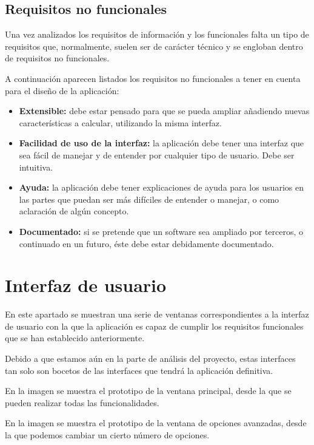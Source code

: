 \newpage
\subsection{Requisitos no funcionales}
Una vez analizados los requisitos de información y los funcionales falta un tipo de requisitos que, normalmente, suelen ser de carácter técnico y se engloban dentro de requisitos no funcionales.

A continuación aparecen listados los requisitos no funcionales a tener en cuenta para el diseño de la aplicación:

\begin{itemize}
 \item \textbf{Extensible:} debe estar pensado para que se pueda ampliar añadiendo nuevas características a calcular, utilizando la misma interfaz.
 \item \textbf{Facilidad de uso de la interfaz:} la aplicación debe tener una interfaz que sea fácil de manejar y de entender por cualquier tipo de usuario. Debe ser intuitiva.
 \item \textbf{Ayuda:} la aplicación debe tener explicaciones de ayuda para los usuarios en las partes que puedan ser más difíciles de entender o manejar, o como aclaración de algún concepto.
 \item \textbf{Documentado:} si se pretende que un software sea ampliado por terceros, o continuado en un futuro, éste debe estar debidamente documentado.
\end{itemize}
\newpage


\section{Interfaz de usuario}
En este apartado se muestran una serie de ventanas correspondientes a la interfaz de usuario con la que la aplicación es capaz de cumplir los requisitos funcionales que se han establecido anteriormente.

Debido a que estamos aún en la parte de análisis del proyecto, estas interfaces tan solo son bocetos de las interfaces que tendrá la aplicación definitiva.

En la imagen  se muestra el prototipo de la ventana principal, desde la que se pueden realizar todas las funcionalidades.


En la imagen  se muestra el prototipo de la ventana de opciones avanzadas, desde la que podemos cambiar un cierto número de opciones.

